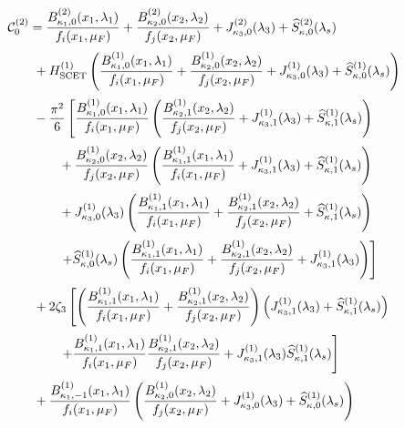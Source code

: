 \begin{equation}
\label{eq:C20}
\begin{aligned}
&\mathcal{C}^{(2)}_0=\frac{B_{\kappa_1,0}^{(2)}(x_1,\lambda_1)}{f_i(x_1,\mu_F)}+\frac{B_{\kappa_2,0}^{(2)}(x_2,\lambda_2)}{f_j(x_2,\mu_F)}+
    J_{\kappa_3,0}^{(2)}(\lambda_3)
    +\widehat{S}^{(2)}_{\kappa,0}(\lambda_s)\\[0.5ex]
    &\qquad + H^{(1)}_{\rm SCET}\left(\frac{B_{\kappa_1,0}^{(1)}(x_1,\lambda_1)}{f_i(x_1,\mu_F)}+\frac{B_{\kappa_2,0}^{(1)}(x_2,\lambda_2)}{f_j(x_2,\mu_F)}+
    J_{\kappa_3,0}^{(1)}(\lambda_3)
    +\widehat{S}^{(1)}_{\kappa,0}(\lambda_s)\right)\\[0.5ex]
    &\qquad -\frac{\pi^2}{6}\left[\frac{B_{\kappa_1,0}^{(1)}(x_1,\lambda_1)}{f_i(x_1,\mu_F)}\left(\frac{B_{\kappa_2,1}^{(1)}(x_2,\lambda_2)}{f_j(x_2,\mu_F)}+J_{\kappa_3,1}^{(1)}(\lambda_3)
    +\widehat{S}^{(1)}_{\kappa,1}(\lambda_s)\right)\right.\\[0.5ex]
    &\qquad\qquad+\frac{B_{\kappa_2,0}^{(1)}(x_2,\lambda_2)}{f_j(x_2,\mu_F)}\left(\frac{B_{\kappa_1,1}^{(1)}(x_1,\lambda_1)}{f_i(x_1,\mu_F)}+J_{\kappa_3,1}^{(1)}(\lambda_3)
    +\widehat{S}^{(1)}_{\kappa,1}(\lambda_s)\right)\\[0.5ex]
    &\qquad\qquad +J_{\kappa_3,0}^{(1)}(\lambda_3)\left(\frac{B_{\kappa_1,1}^{(1)}(x_1,\lambda_1)}{f_i(x_1,\mu_F)}+\frac{B_{\kappa_2,1}^{(1)}(x_2,\lambda_2)}{f_j(x_2,\mu_F)}+\widehat{S}^{(1)}_{\kappa,1}(\lambda_s)\right)\\[0.5ex]
    &\qquad\qquad \left.+\widehat{S}^{(1)}_{\kappa,0}(\lambda_s)\left(\frac{B_{\kappa_1,1}^{(1)}(x_1,\lambda_1)}{f_i(x_1,\mu_F)}+\frac{B_{\kappa_2,1}^{(1)}(x_2,\lambda_2)}{f_j(x_2,\mu_F)}+J_{\kappa_3,1}^{(1)}(\lambda_3)\right)\right]\\[0.5ex]
    &\qquad +2\zeta_3\left[\left(\frac{B^{(1)}_{\kappa_1,1}(x_1,\lambda_1)}{f_i(x_1,\mu_F)}+\frac{B^{(1)}_{\kappa_2,1}(x_2,\lambda_2)}{f_j(x_2,\mu_F)}\right)\left(J_{\kappa_3,1}^{(1)}(\lambda_3)+\widehat{S}^{(1)}_{\kappa,1}(\lambda_s)\right)\right.\\[0.5ex]
    &\qquad\qquad\left.+\frac{B^{(1)}_{\kappa_1,1}(x_1,\lambda_1)}{f_i(x_1,\mu_F)}\frac{B^{(1)}_{\kappa_2,1}(x_2,\lambda_2)}{f_j(x_2,\mu_F)}+J_{\kappa_3,1}^{(1)}(\lambda_3)\widehat{S}^{(1)}_{\kappa,1}(\lambda_s)\right]\\[0.5ex]
    &\qquad +\frac{B_{\kappa_1,-1}^{(1)}(x_1,\lambda_1)}{f_i(x_1,\mu_F)}\left(\frac{B_{\kappa_2,0}^{(1)}(x_2,\lambda_2)}{f_j(x_2,\mu_F)}+J_{\kappa_3,0}^{(1)}(\lambda_3)
    +\widehat{S}^{(1)}_{\kappa,0}(\lambda_s)\right)\\[0.5ex]

\end{aligned}
\end{equation}
